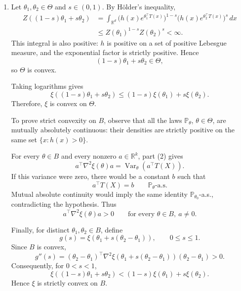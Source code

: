 \documentclass[lang=en,11pt,a4paper,citestyle=authoryear]{elegantpaper}
\newcommand{\R}{\mathbb{R}}
\newcommand{\E}{\mathbb{E}}
\renewcommand{\P}{\mathbb{P}}
\begin{document}
\begin{enumerate}[label=(\arabic*),leftmargin=*]
For $u\in\R^k$, the moment-generating function of $T(X)$ is
\[
\begin{aligned}
M_\theta(u)
&:=\E_\theta e^{u^\top T(X)}\\
&=
e^{-\xi(\theta)}
\int_{\R^d}h(x)e^{(\theta+u)^\top T(x)}\,dx.
\end{aligned}
\]
It is finite exactly when $\theta+u\in\Theta$, and in that case
\[
{
M_\theta(u)
=
\exp\{\xi(\theta+u)-\xi(\theta)\}
}.
\]
In particular, it is finite in a neighborhood of $u=0$ whenever
$\theta\in B$.

\item Let $\theta_1,\theta_2\in\Theta$ and $s\in(0,1)$.
By H\"older's inequality,
\[
\begin{aligned}
Z((1-s)\theta_1+s\theta_2)
&=
\int_{\R^d}
\bigl(h(x)e^{\theta_1^\top T(x)}\bigr)^{1-s}
\bigl(h(x)e^{\theta_2^\top T(x)}\bigr)^s\,dx\\
&\leq
Z(\theta_1)^{1-s}Z(\theta_2)^s
<\infty.
\end{aligned}
\]
This integral is also positive: $h$ is positive on a set of
positive Lebesgue measure, and the exponential factor is
strictly positive. Hence
\[
(1-s)\theta_1+s\theta_2\in\Theta,
\]
so $\Theta$ is convex.

Taking logarithms gives
\[
\xi((1-s)\theta_1+s\theta_2)
\leq
(1-s)\xi(\theta_1)+s\xi(\theta_2).
\]
Therefore, $\xi$ is convex on $\Theta$.

To prove strict convexity on $B$, observe that all the laws
$\P_\theta$, $\theta\in\Theta$, are mutually absolutely continuous:
their densities are strictly positive on the same set
$\{x:h(x)>0\}$.

For every $\theta\in B$ and every nonzero $a\in\R^k$,
part (2) gives
\[
a^\top\nabla^2\xi(\theta)a
=
\operatorname{Var}_\theta(a^\top T(X)).
\]
If this variance were zero, there would be a constant $b$ such that
\[
a^\top T(X)=b
\qquad \P_\theta\text{-a.s.}
\]
Mutual absolute continuity would imply the same identity
$\P_{\theta_0}$-a.s., contradicting the hypothesis.
Thus
\[
a^\top\nabla^2\xi(\theta)a>0
\qquad
\text{for every }\theta\in B,\ a\ne0.
\]

Finally, for distinct $\theta_1,\theta_2\in B$, define
\[
g(s)=\xi(\theta_1+s(\theta_2-\theta_1)),
\qquad 0\leq s\leq1.
\]
Since $B$ is convex,
\[
g''(s)
=
(\theta_2-\theta_1)^\top
\nabla^2\xi(\theta_1+s(\theta_2-\theta_1))
(\theta_2-\theta_1)
>0.
\]
Consequently, for $0<s<1$,
\[
\xi((1-s)\theta_1+s\theta_2)
<
(1-s)\xi(\theta_1)+s\xi(\theta_2).
\]
Hence $\xi$ is strictly convex on $B$.
\end{enumerate}
\end{document}

